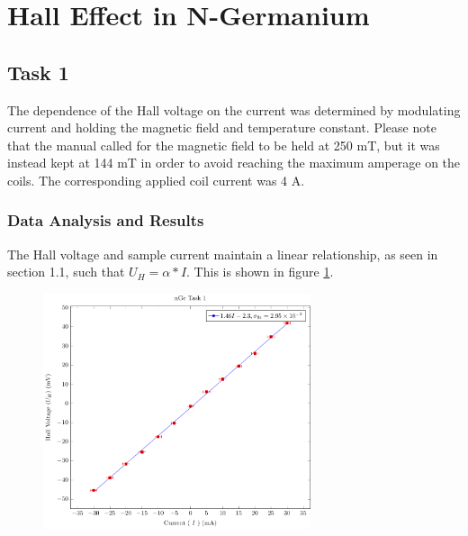 \documentclass[a4paper]{article}
\begin{document}
\section{Hall Effect in N-Germanium}

\subsection{Task 1}

\qq The dependence of the Hall voltage on the current was determined 
by modulating current and holding the magnetic field and temperature 
constant. Please note that the manual called for the magnetic field to 
be held at 250 mT, but it was instead kept at 144 mT in order to 
avoid reaching the maximum amperage on the coils. The corresponding
applied coil current was 4 A.

\subsubsection{Data Analysis and Results}
\qq The Hall voltage and sample current maintain a linear
relationship, as seen in section 1.1, such that $U_H = \alpha *
I$. This is shown in figure \ref{task31plot}.

\begin{figure}[H]
\centering
\includegraphics[width=0.7\textwidth]{NGePlots/Task1/nGeTask1.pdf}
\label{task31plot}
\end{figure}
\end{document}
